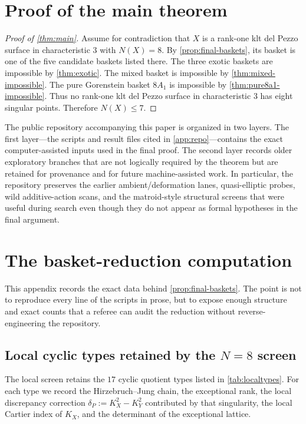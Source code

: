 \documentclass[11pt]{article}
\theoremstyle{definition}
\begin{document}
\section{Proof of the main theorem}

\begin{proof}[Proof of \cref{thm:main}]
Assume for contradiction that $X$ is a rank-one klt del Pezzo surface in characteristic $3$ with $N(X)=8$. By \cref{prop:final-baskets}, its basket is one of the five candidate baskets listed there. The three exotic baskets are impossible by \cref{thm:exotic}. The mixed basket is impossible by \cref{thm:mixed-impossible}. The pure Gorenstein basket $8A_1$ is impossible by \cref{thm:pure8a1-impossible}. Thus no rank-one klt del Pezzo surface in characteristic $3$ has eight singular points. Therefore $N(X)\le 7$.
\end{proof}

The public repository accompanying this paper is organized in two layers. The first layer---the scripts and result files cited in \cref{app:repo}---contains the exact computer-assisted inputs used in the final proof. The second layer records older exploratory branches that are not logically required by the theorem but are retained for provenance and for future machine-assisted work. In particular, the repository preserves the earlier ambient/deformation lanes, quasi-elliptic probes, wild additive-action scans, and the matroid-style structural screens that were useful during search even though they do not appear as formal hypotheses in the final argument.

\appendix

\section{The basket-reduction computation}\label{app:basket}
This appendix records the exact data behind \cref{prop:final-baskets}. The point is not to reproduce every line of the scripts in prose, but to expose enough structure and exact counts that a referee can audit the reduction without reverse-engineering the repository.

\subsection{Local cyclic types retained by the $N=8$ screen}
The local screen retains the $17$ cyclic quotient types listed in \cref{tab:localtypes}. For each type we record the Hirzebruch--Jung chain, the exceptional rank, the local discrepancy correction $\delta_P:=K_X^2-K_Y^2$ contributed by that singularity, the local Cartier index of $K_X$, and the determinant of the exceptional lattice.
\end{document}
